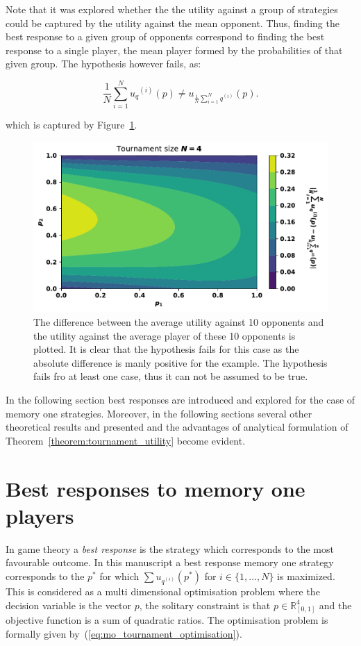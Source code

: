 \documentclass[10pt]{article}
\newcommand{\R}{\mathbb{R}}
\begin{document}
Note that it was explored whether the the utility against a group of strategies could be
captured by the utility against the mean opponent. Thus, finding the best response
to a given group of opponents correspond to finding the best response to a single
player, the mean player formed by the probabilities of that given group. The
hypothesis however fails, as:

\begin{equation}\label{eq:tournament_hypothesis}
    \frac{1}{N} \sum_{i=1} ^ {N} {u_q}^{(i)} (p) \neq u_{\frac {1}{N} \sum\limits_{i=1} ^ N q^{(i)}}(p).
\end{equation}

which is captured by Figure~\ref{fig:hypothesis}.

\begin{figure}[!htbp]
    \begin{center}
    \includegraphics[width=.5\linewidth]{img/mean_vs_average_heatmap.pdf}
    \end{center}
    \caption{The difference between the average utility against 10
    opponents and the utility against the average player of these 10 opponents
    is plotted. It is clear that the hypothesis fails for this case as the
    absolute difference is manly positive for the example. The hypothesis fails
    fro at least one case, thus it can not be assumed to be true.}
    \label{fig:hypothesis}
\end{figure}

In the following section best responses are introduced and explored for the case
of memory one strategies. Moreover, in the following sections several other
theoretical results and presented and the advantages of analytical formulation
of Theorem~\ref{theorem:tournament_utility} become evident.


\section{Best responses to memory one players}\label{section:best_response_mem_one}

In game theory a \textit{best response} is the strategy which corresponds to the most
favourable outcome. In this manuscript a best response memory one strategy
corresponds to the \(p^*\) for which \(\sum u_{q ^{(i)}} (p^*)\) for \(i \in \{1, \dots, N\}\)
is maximized. This is considered as a multi dimensional optimisation problem
where the decision variable is the vector \(p\), the solitary constraint is
that \(p \in \R^4_{[0, 1]} \) and the objective function is a sum of quadratic
ratios. The optimisation problem is formally given by~(\ref{eq:mo_tournament_optimisation}).
\end{document}
